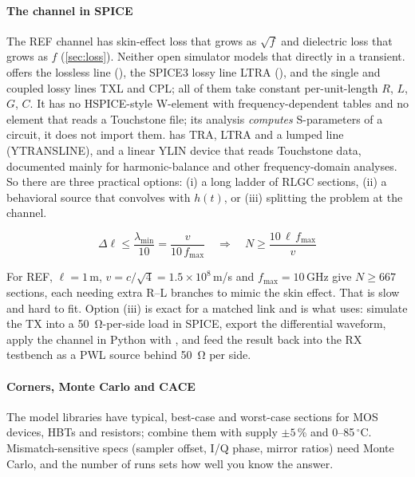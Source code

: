 \paragraph{The channel in SPICE} The REF channel has skin-effect loss that grows as $\sqrt f$ and dielectric loss that grows as $f$ (\cref{sec:loss}). Neither open simulator models that directly in a transient.  offers the lossless line (), the SPICE3 lossy line LTRA (), and the single and coupled lossy lines TXL and CPL; all of them take constant per-unit-length $R$, $L$, $G$, $C$. It has no HSPICE-style W-element with frequency-dependent tables and no element that reads a Touchstone file; its  analysis \emph{computes} S-parameters of a circuit, it does not import them.  has TRA, LTRA and a lumped line (YTRANSLINE), and a linear YLIN device that reads Touchstone data, documented mainly for harmonic-balance and other frequency-domain analyses. So there are three practical options: (i) a long ladder of RLGC sections, (ii) a behavioral source that convolves with $h(t)$, or (iii) splitting the problem at the channel.

\begin{keyeq}
\begin{equation}
  \Delta\ell\le\frac{\lambda_\mathrm{min}}{10}=\frac{v}{10\,f_\mathrm{max}}
  \quad\Rightarrow\quad N\ge\frac{10\,\ell\,f_\mathrm{max}}{v}
  \label{eq:ch15-seg}
\end{equation}
\end{keyeq}

For REF, $\ell=1$\,m, $v=c/\sqrt{4}=1.5\times10^8$\,m/s and $f_\mathrm{max}=10$\,GHz give $N\ge667$ sections, each needing extra R--L branches to mimic the skin effect. That is slow and hard to fit. Option (iii) is exact for a matched link and is what \OS{} uses: simulate the TX into a \qty{50}{\ohm}-per-side load in SPICE, export the differential waveform, apply the channel in Python with , and feed the result back into the RX testbench as a PWL source behind \qty{50}{\ohm} per side.

\paragraph{Corners, Monte Carlo and CACE} The \sgx{} model libraries have typical, best-case and worst-case sections for MOS devices, HBTs and resistors; combine them with supply $\pm5$\,\% and 0--85\,$^\circ$C. Mismatch-sensitive specs (sampler offset, I/Q phase, mirror ratios) need Monte Carlo, and the number of runs sets how well you know the answer.

